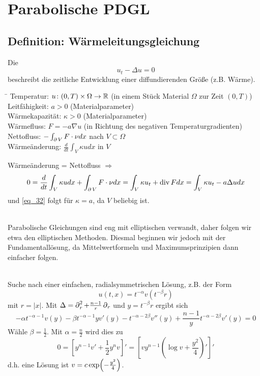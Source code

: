 \section{Parabolische PDGL}
\label{sec:para11}
	
\subsection{Definition: Wärmeleitungsgleichung}
	Die  
	\begin{equation}
		u_t - \Delta u = 0 \label{eq_32}
	\end{equation}
	beschreibt die zeitliche Entwicklung einer diffundierenden Größe (z.B. Wärme).
	\begin{tabbing}
	\hspace{3cm}\=\kill
	Temperatur: \> $u \colon (0,T) \times \Omega \rightarrow \mathbb{R}$ (in einem Stück Material $\Omega$ zur Zeit $(0,T)$)\\ 
	Leitfähigkeit: \> $a > 0$ (Materialparameter)\\ 
	Wärmekapazität: \> $\kappa > 0$ (Materialparameter)\\ 
	Wärmefluss: \> $F = -a \nabla u$ (in Richtung des negativen Temperaturgradienten)\\ 
	Nettofluss: \> $- \int_{\operatorname{\partial} V} F \cdot \nu dx$ nach $V \subset \Omega$\\ 
	Wärmeänderung: \> $\frac{d}{dt} \int_V \kappa u dx$ in $V$ 
	\end{tabbing} 
	Wärmeänderung = Nettofluss $\Rightarrow$
	\[ 0 = \frac{d}{dt} \int_V \kappa u dx + \int_{\operatorname{\partial} V} F \cdot \nu dx = \int_V \kappa u_t + \operatorname{div} F dx = \int_V \kappa u_t - a \Delta u dx \]
	und \eqref{eq_32} folgt für $\kappa = a$, da $V$ beliebig ist.
	
	\mbox{} \\
	Parabolische Gleichungen sind eng mit elliptischen verwandt, daher folgen wir etwa den elliptischen Methoden. Diesmal beginnen wir jedoch mit der Fundamentallösung, da Mittelwertformeln und Maximumsprinzipien dann einfacher folgen.
	
	\mbox{} \\
	Suche nach einer einfachen, radialsymmetrischen Lösung, z.B. der Form
	\[ u(t,x) = t^{-\alpha} v(t^{-\beta} r) \]
	mit $r = |x|$. Mit $\Delta = \operatorname{\partial}_r^2 + \frac{n-1}{r} \operatorname{\partial}_r$ und $y = t^{-\beta} r$ ergibt sich
	\[ -\alpha t^{-\alpha - 1} v(y) - \beta t^{-\alpha-1} y v'(y) - t^{-\alpha - 2\beta} v''(y) + \frac{n-1}{y} t^{-\alpha - 2\beta} v'(y) = 0\]
	Wähle $\beta = \frac{1}{2}$. Mit $\alpha = \frac{n}{2}$ wird dies zu
	\[ 0 = [y^{n-1} v' + \frac{1}{2} y^n v]' = [vy^{n-1} (\log v + \frac{y^2}{4})']' \]
	d.h. eine Lösung ist $v = c \exp \enbrace*{-\frac{y^2}{4}}$.
	
